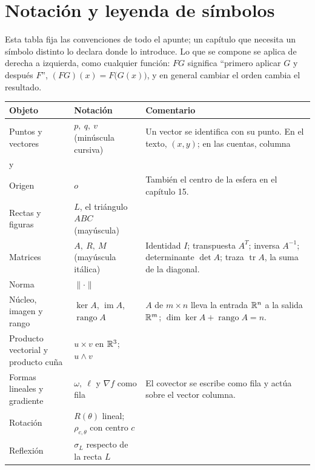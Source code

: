 \section{Notación y leyenda de símbolos}\label{sec:notacion}

Esta tabla fija las convenciones de todo el apunte; un capítulo que necesita un símbolo
distinto lo declara donde lo introduce. Lo que se compone se aplica de derecha a izquierda,
como cualquier función: \(FG\) significa \enquote{primero aplicar \(G\) y después \(F\)}, \((F
G)(x)=F\bigl(G(x)\bigr)\), y en general cambiar el orden cambia el resultado.

{\small
\begin{longtable}{@{}>{\raggedright\arraybackslash}p{38mm}>{\raggedright\arraybackslash}p{44mm}>{\raggedright\arraybackslash}p{62mm}@{}}
\toprule
\textbf{Objeto} & \textbf{Notación} & \textbf{Comentario}\\
\midrule
\endhead
\bottomrule
\endlastfoot
Puntos y vectores & \(p,\ q,\ v\) (minúscula cursiva) & Un vector se identifica con su punto. En el texto, \((x,y)\); en las cuentas, columna \(\begin{pmatrix}x\\y\end{pmatrix}\).\\
Origen & \(o\) & También el centro de la esfera en el capítulo 15.\\
Rectas y figuras & \(L\), el triángulo \(ABC\) (mayúscula) & \\
Matrices & \(A,\ R,\ M\) (mayúscula itálica) & Identidad \(I\); transpuesta \(A^T\); inversa \(A^{-1}\); determinante \(\det A\); traza \(\operatorname{tr}A\), la suma de la diagonal.\\
Norma & \(\lVert\cdot\rVert\) & \\
Núcleo, imagen y rango & \(\ker A\), \(\operatorname{im}A\), \(\operatorname{rango}A\) & \(A\) de \(m\times n\) lleva la entrada \(\mathbb{R}^n\) a la salida \(\mathbb{R}^m\); \(\dim\ker A+\operatorname{rango}A=n\).\\
Producto vectorial y producto cuña & \(u\times v\) en \(\mathbb{R}^3\); \(u\wedge v\) & \\
Formas lineales y gradiente & \(\omega,\ \ell\) y \(\nabla f\) como fila & El covector se escribe como fila y actúa sobre el vector columna.\\
Rotación & \(R(\theta)\) lineal; \(\rho_{c,\theta}\) con centro \(c\) & \\
Reflexión & \(\sigma_L\) respecto de la recta \(L\) & \\

\end{longtable}}
